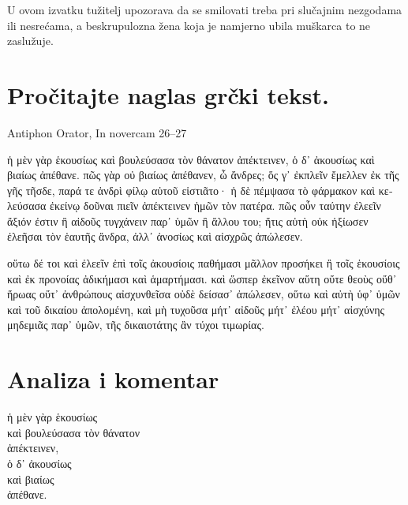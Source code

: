 U ovom izvatku tužitelj upozorava da se smilovati treba pri slučajnim nezgodama ili nesrećama, a beskrupulozna žena koja je namjerno ubila muškarca to ne zaslužuje.



\section*{Pročitajte naglas grčki tekst.}

Antiphon Orator, In novercam 26–27


\medskip


{\large

\begin{greek}

\noindent ἡ μὲν γὰρ ἑκουσίως καὶ βουλεύσασα τὸν θάνατον ἀπέκτεινεν, ὁ δ᾽ ἀκουσίως καὶ βιαίως ἀπέθανε. πῶς γὰρ οὐ βιαίως ἀπέθανεν, ὦ ἄνδρες; ὅς γ᾽ ἐκπλεῖν ἔμελλεν ἐκ τῆς γῆς τῆσδε, παρά τε ἀνδρὶ φίλῳ αὑτοῦ εἱστιᾶτο· ἡ δὲ πέμψασα τὸ φάρμακον καὶ κελεύσασα ἐκείνῳ δοῦναι πιεῖν ἀπέκτεινεν ἡμῶν τὸν πατέρα. πῶς οὖν ταύτην ἐλεεῖν ἄξιόν ἐστιν ἢ αἰδοῦς τυγχάνειν παρ᾽ ὑμῶν ἢ ἄλλου του; ἥτις αὐτὴ οὐκ ἠξίωσεν ἐλεῆσαι τὸν ἑαυτῆς ἄνδρα, ἀλλ᾽ ἀνοσίως καὶ αἰσχρῶς ἀπώλεσεν.

οὕτω δέ τοι καὶ ἐλεεῖν ἐπὶ τοῖς ἀκουσίοις παθήμασι μᾶλλον προσήκει ἢ τοῖς ἑκουσίοις καὶ ἐκ προνοίας ἀδικήμασι καὶ ἁμαρτήμασι. καὶ ὥσπερ ἐκεῖνον αὕτη οὔτε θεοὺς οὔθ᾽ ἥρωας οὔτ᾽ ἀνθρώπους αἰσχυνθεῖσα οὐδὲ δείσασ᾽ ἀπώλεσεν, οὕτω καὶ αὐτὴ ὑφ᾽ ὑμῶν καὶ τοῦ δικαίου ἀπολομένη, καὶ μὴ τυχοῦσα μήτ᾽ αἰδοῦς μήτ᾽ ἐλέου μήτ᾽ αἰσχύνης μηδεμιᾶς παρ᾽ ὑμῶν, τῆς δικαιοτάτης ἂν τύχοι τιμωρίας.

\end{greek}

}


\section*{Analiza i komentar}


{\large
\begin{greek}
\noindent ἡ μὲν γὰρ ἑκουσίως \\
\tabto{2em} καὶ βουλεύσασα τὸν θάνατον \\
ἀπέκτεινεν, \\
ὁ δ᾽ ἀκουσίως \\
\tabto{2em} καὶ βιαίως \\
ἀπέθανε.\\

\end{greek}
}


